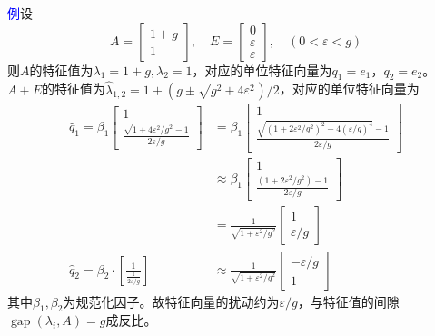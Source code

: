 \documentclass[12pt,a4paper]{article}
\begin{document}
\textcolor{blue}{例}\quad 设$$
A=\left[\begin{array}{c}{1+g} \\ {1}\end{array}\right], \quad E=\left[\begin{array}{c}{0} \\ {\varepsilon} \\ {\varepsilon}\end{array}\right], \quad(0<\varepsilon<g)
$$
则$A$的特征值为$\lambda_{1}=1+g, \lambda_{2}=1$，对应的单位特征向量为$q_{1}=e_{1}，q_{2}=e_{2}$。$A+E$的特征值为$\hat{\lambda}_{1,2}=1+\left(g \pm \sqrt{g^{2}+4 \varepsilon^{2}}\right) / 2$，对应的单位特征向量为$$
\begin{aligned} \hat{q}_{1}
=\beta_{1} \left[\begin{array}{c}{1} \\ {\frac{\sqrt{1+4 \varepsilon^{2} / g^{2}}-1}{2 \varepsilon / g}}\end{array}\right]
&=\beta_{1} \left[\begin{array}{c}{1} \\ {\frac{\sqrt{\left(1+2 \varepsilon^{2} / g^{2}\right)^{2}-4(\varepsilon / g)^{4}}-1}{2 \varepsilon / g}}\end{array}\right] \\
& \approx \beta_{1} \left[\begin{array}{c}{1} \\ {\frac{\left(1+2 \varepsilon^{2} / g^{2}\right)-1}{2 \varepsilon / g}}\end{array}\right]\\
&=\frac{1}{\sqrt{1+\varepsilon^{2} / g^{2}}}\left[\begin{array}{c}{1} \\ {\varepsilon / g}\end{array}\right]\\
\hat{q}_{2}=\beta_{2} \cdot\left[\frac{1}{\frac{1}{2 \varepsilon / g}}\right] &\approx \frac{1}{\sqrt{1+\varepsilon^{2} / g^{2}}}\left[\begin{array}{c}{-\varepsilon / g} \\ {1}\end{array}\right]\end{aligned}
$$
其中$\beta_1,\beta_2$为规范化因子。故特征向量的扰动约为$\varepsilon / g$，与特征值的间隙$\operatorname{gap}\left(\lambda_{i}, A\right)=g$成反比。
\end{document}
